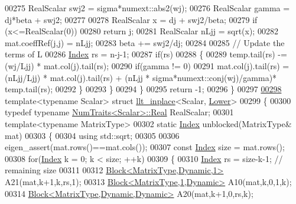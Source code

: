 \begin{DoxyCode}
00275       RealScalar swj2 = sigma*numext::abs2(wj);
00276       RealScalar gamma = dj*beta + swj2;
00277 
00278       RealScalar x = dj + swj2/beta;
00279       \textcolor{keywordflow}{if} (x<=RealScalar(0))
00280         \textcolor{keywordflow}{return} j;
00281       RealScalar nLjj = sqrt(x);
00282       mat.coeffRef(j,j) = nLjj;
00283       beta += swj2/dj;
00284 
00285       \textcolor{comment}{// Update the terms of L}
00286       \hyperlink{namespace_eigen_a62e77e0933482dafde8fe197d9a2cfde}{Index} rs = n-j-1;
00287       \textcolor{keywordflow}{if}(rs)
00288       \{
00289         temp.tail(rs) -= (wj/Ljj) * mat.col(j).tail(rs);
00290         \textcolor{keywordflow}{if}(gamma != 0)
00291           mat.col(j).tail(rs) = (nLjj/Ljj) * mat.col(j).tail(rs) + (nLjj * sigma*numext::conj(wj)/gamma)*
      temp.tail(rs);
00292       \}
00293     \}
00294   \}
00295   \textcolor{keywordflow}{return} -1;
00296 \}
00297 
\hyperlink{struct_eigen_1_1internal_1_1llt__inplace_3_01_scalar_00_01_lower_01_4}{00298} \textcolor{keyword}{template}<\textcolor{keyword}{typename} Scalar> \textcolor{keyword}{struct }\hyperlink{struct_eigen_1_1internal_1_1llt__inplace}{llt\_inplace}<Scalar, \hyperlink{group__enums_gga39e3366ff5554d731e7dc8bb642f83cda891792b8ed394f7607ab16dd716f60e6}{Lower}>
00299 \{
00300   \textcolor{keyword}{typedef} \textcolor{keyword}{typename} \hyperlink{group___core___module_struct_eigen_1_1_num_traits}{NumTraits<Scalar>::Real} RealScalar;
00301   \textcolor{keyword}{template}<\textcolor{keyword}{typename} MatrixType>
00302   \textcolor{keyword}{static} \hyperlink{namespace_eigen_a62e77e0933482dafde8fe197d9a2cfde}{Index} unblocked(MatrixType& mat)
00303   \{
00304     \textcolor{keyword}{using} std::sqrt;
00305 
00306     eigen\_assert(mat.rows()==mat.cols());
00307     \textcolor{keyword}{const} \hyperlink{namespace_eigen_a62e77e0933482dafde8fe197d9a2cfde}{Index} size = mat.rows();
00308     \textcolor{keywordflow}{for}(\hyperlink{namespace_eigen_a62e77e0933482dafde8fe197d9a2cfde}{Index} k = 0; k < size; ++k)
00309     \{
00310       \hyperlink{namespace_eigen_a62e77e0933482dafde8fe197d9a2cfde}{Index} rs = size-k-1; \textcolor{comment}{// remaining size}
00311 
00312       \hyperlink{group___core___module_class_eigen_1_1_block}{Block<MatrixType,Dynamic,1>} A21(mat,k+1,k,rs,1);
00313       \hyperlink{group___core___module_class_eigen_1_1_block}{Block<MatrixType,1,Dynamic>} A10(mat,k,0,1,k);
00314       \hyperlink{group___core___module_class_eigen_1_1_block}{Block<MatrixType,Dynamic,Dynamic>} A20(mat,k+1,0,rs,k);

\end{DoxyCode}
